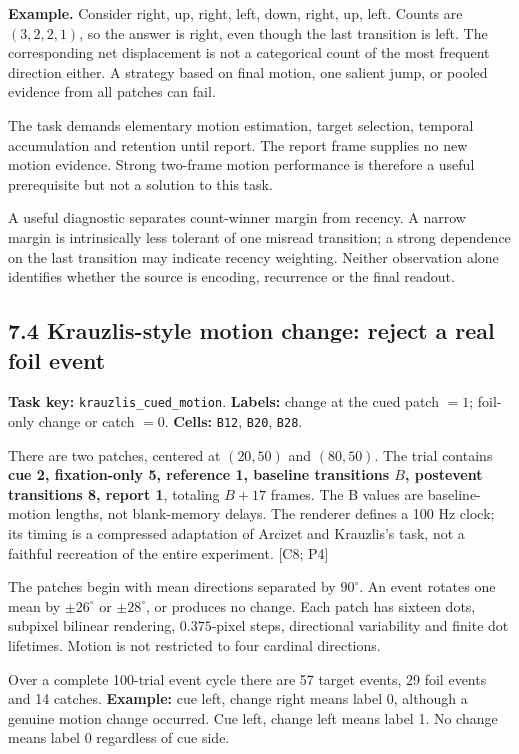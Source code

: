 \documentclass[
  11pt,
]{article}
\let\oldsubsection\subsection
\renewcommand{\subsection}{\Needspace{6\baselineskip}\oldsubsection}
\begin{document}
\textbf{Example.} Consider right, up, right, left, down, right, up,
left. Counts are \((3,2,2,1)\), so the answer is right, even though the
last transition is left. The corresponding net displacement is not a
categorical count of the most frequent direction either. A strategy
based on final motion, one salient jump, or pooled evidence from all
patches can fail.

The task demands elementary motion estimation, target selection,
temporal accumulation and retention until report. The report frame
supplies no new motion evidence. Strong two-frame motion performance is
therefore a useful prerequisite but not a solution to this task.

A useful diagnostic separates count-winner margin from recency. A narrow
margin is intrinsically less tolerant of one misread transition; a
strong dependence on the last transition may indicate recency weighting.
Neither observation alone identifies whether the source is encoding,
recurrence or the final readout.

\subsection{7.4 Krauzlis-style motion change: reject a real foil
event}\label{krauzlis-style-motion-change-reject-a-real-foil-event}

\textbf{Task key:} \texttt{krauzlis\_cued\_motion}. \textbf{Labels:}
change at the cued patch \(=1\); foil-only change or catch \(=0\).
\textbf{Cells:} \texttt{B12}, \texttt{B20}, \texttt{B28}.

There are two patches, centered at \((20,50)\) and \((80,50)\). The
trial contains \textbf{cue 2, fixation-only 5, reference 1, baseline
transitions \(B\), postevent transitions 8, report 1}, totaling \(B+17\)
frames. The B values are baseline-motion lengths, not blank-memory
delays. The renderer defines a 100 Hz clock; its timing is a compressed
adaptation of Arcizet and Krauzlis's task, not a faithful recreation of
the entire experiment. {[}C8; P4{]}

The patches begin with mean directions separated by \(90^\circ\). An
event rotates one mean by \(\pm26^\circ\) or \(\pm28^\circ\), or
produces no change. Each patch has sixteen dots, subpixel bilinear
rendering, \(0.375\)-pixel steps, directional variability and finite dot
lifetimes. Motion is not restricted to four cardinal directions.

Over a complete 100-trial event cycle there are 57 target events, 29
foil events and 14 catches. \textbf{Example:} cue left, change right
means label 0, although a genuine motion change occurred. Cue left,
change left means label 1. No change means label 0 regardless of cue
side.
\end{document}
